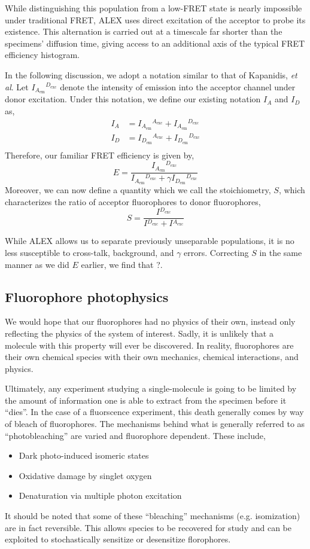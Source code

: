 \documentclass{article}
\newcommand{\emm}[1]{\ensuremath{_{#1_\mathrm{em}}}}   %
\newcommand{\exc}[1]{\ensuremath{^{#1_\mathrm{exc}}}}  %
\newcommand{\I}[2]{\ensuremath{I\emm{#1}\exc{#2}}}
\begin{document}
While distinguishing this population from a low-FRET state is nearly
impossible under traditional FRET, ALEX uses direct excitation of the
acceptor to probe its existence. This alternation is carried out at a
timescale far shorter than the specimens' diffusion time, giving
access to an additional axis of the typical FRET efficiency histogram.

In the following discussion, we adopt a notation similar to that of
Kapanidis, {\it et al}. Let \I{A}{D} denote the intensity of emission
into the acceptor channel under donor excitation. Under this notation,
we define our existing notation $I_A$ and $I_D$ as,
\begin{align*}
  I_A & = \I{A}{A} + \I{A}{D} \\
  I_D & = \I{D}{A} + \I{D}{D} \\
\end{align*}
Therefore, our familiar FRET efficiency is given by,
\[ E = \frac{\I{A}{D}}{\I{A}{D} + \gamma \I{D}{D}} \]
Moreover, we can now define a quantity which we call the
stoichiometry, $S$, which characterizes the ratio of acceptor
fluorophores to donor fluorophores,
\[ S = \frac{I\exc{D}}{I\exc{D} + I\exc{A}} \]

While ALEX allows us to separate previously unseparable populations,
it is no less susceptible to cross-talk, background, and $\gamma$
errors. Correcting $S$ in the same manner as we did $E$ earlier, we
find that ?.


\subsection{Fluorophore photophysics}
We would hope that our fluorophores had no physics of their own,
instead only reflecting the physics of the system of interest. Sadly,
it is unlikely that a molecule with this property will ever be
discovered. In reality, fluorophores are their own chemical species
with their own mechanics, chemical interactions, and physics. 

Ultimately, any experiment studying a single-molecule is going to be
limited by the amount of information one is able to extract from the
specimen before it ``dies''. In the case of a fluorscence experiment,
this death generally comes by way of bleach of fluorophores. The
mechanisms behind what is generally referred to as ``photobleaching''
are varied and fluorophore dependent. These include,
\begin{itemize}
\item Dark photo-induced isomeric states
\item Oxidative damage by singlet oxygen
\item Denaturation via multiple photon excitation\cite{Deschenes2002}
\end{itemize}
It should be noted that some of these ``bleaching'' mechanisms
(e.g. isomization) are in fact reversible. This allows species to be
recovered for study and can be exploited to stochastically sensitize
or desensitize florophores.
\end{document}

